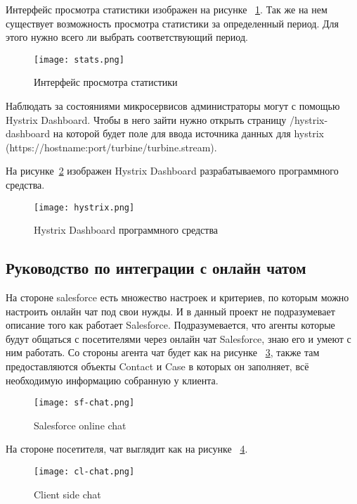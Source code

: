 Интерфейс просмотра статистики изображен на рисунке ~\ref{fig:stats}.
Так же на нем существует возможность просмотра статистики за определенный период. Для этого нужно всего ли выбрать соответствующий период.


\pagebreak
\begin{figure}[ht]
\centering
  \texttt{[image: stats.png]}  
  \caption{Интерфейс просмотра статистики}
	\label{fig:stats}
\end{figure}

Наблюдать за состояниями микросервисов администраторы могут с помощью Hystrix Dashboard. Чтобы в него зайти нужно открыть страницу /hystrix-dashboard на которой будет поле для ввода источника данных для hystrix (https://hostname:port/turbine/turbine.stream).

На рисунке~\ref{fig:hystrix-m} изображен Hystrix Dashboard разрабатываемого программного средства.
\pagebreak
\begin{figure}[h]
\centering
  \texttt{[image: hystrix.png]}  
  \caption{Hystrix Dashboard программного средства}
  \label{fig:hystrix-m}
\end{figure} 



\subsection{Руководство по интеграции с онлайн чатом}
\label{sub:manual:chat}
На стороне salesforce есть множество настроек и критериев, по которым можно настроить онлайн чат под свои нужды. И в данный проект не подразумевает описание того как работает Salesforce. Подразумевается, что агенты которые будут общаться с посетителями через онлайн чат Salesforce, знаю его и умеют с ним работать. 
Со стороны агента чат будет как на рисунке ~\ref{fig:sf-chat}, также там предоставляются объекты Contact и Case в которых он заполняет, всё необходимую информацию собранную у клиента.

\begin{figure}[ht]
\centering
  \texttt{[image: sf-chat.png]}  
  \caption{Salesforce online chat}
  \label{fig:sf-chat}
\end{figure}



\pagebreak
На стороне посетителя, чат выглядит как на рисунке ~\ref{fig:cl-chat}.

\begin{figure}[ht]
\centering
  \texttt{[image: cl-chat.png]}  
  \caption{Client side chat}
  \label{fig:cl-chat}
\end{figure}